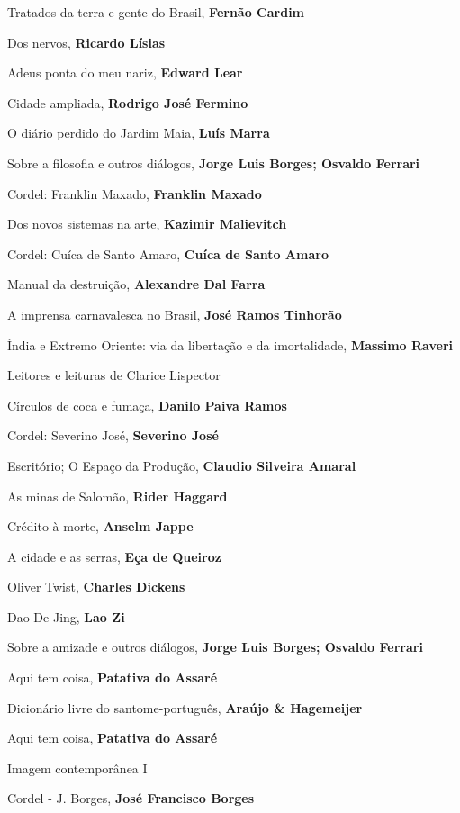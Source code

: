 \begin{multicols}{2}
\begin{enumerate}
{\item Tratados da terra e gente do Brasil, \textbf{Fernão Cardim}
\item Dos nervos, \textbf{Ricardo Lísias}
\item Adeus ponta do meu nariz, \textbf{Edward Lear}
\item Cidade ampliada, \textbf{Rodrigo José Fermino}
\item O diário perdido do Jardim Maia, \textbf{Luís Marra}
\item Sobre a filosofia e outros diálogos, \textbf{Jorge Luis Borges; Osvaldo Ferrari}
\item Cordel: Franklin Maxado, \textbf{Franklin Maxado}
\item Dos novos sistemas na arte, \textbf{Kazimir Malievitch}
\item Cordel: Cuíca de Santo Amaro, \textbf{Cuíca de Santo Amaro}
\item Manual da destruição, \textbf{Alexandre Dal Farra}
\item A imprensa carnavalesca no Brasil, \textbf{José Ramos Tinhorão}
\item Índia e Extremo Oriente: via da libertação e da imortalidade, \textbf{Massimo Raveri}
\item Leitores e leituras de Clarice Lispector
\item Círculos de coca e fumaça, \textbf{Danilo Paiva Ramos}
\item Cordel: Severino José, \textbf{Severino José}
\item Escritório; O Espaço da Produção, \textbf{Claudio Silveira Amaral}
\item As minas de Salomão, \textbf{Rider Haggard}
\item Crédito à morte, \textbf{Anselm Jappe}
\item A cidade e as serras, \textbf{Eça de Queiroz}
\item Oliver Twist, \textbf{Charles Dickens}
\item Dao De Jing, \textbf{Lao Zi}
\item Sobre a amizade e outros diálogos, \textbf{Jorge Luis Borges; Osvaldo Ferrari}
\item Aqui tem coisa, \textbf{Patativa do Assaré}
\item Dicionário livre do santome-português, \textbf{Araújo \& Hagemeijer}
\item Aqui tem coisa, \textbf{Patativa do Assaré}
\item Imagem contemporânea I
\item Cordel - J. Borges, \textbf{José Francisco Borges}
}
\end{enumerate}
\end{multicols}
